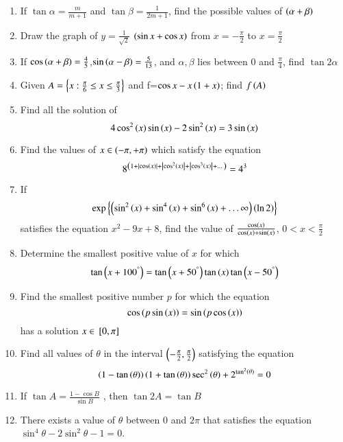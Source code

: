 \begin{enumerate}[label=\thesubsection.\arabic*,ref=\thesubsection.\theenumi]
\begin{enumerate}
\end{enumerate}
\item If $\tan{\alpha}=\frac{m}{m+1}$ and $\tan{\beta}=\frac{1}{2m+1}$, find the possible values of $\left(\alpha+\beta\right)$ \hfill{}
    \item Draw the graph of $y=\frac{1}{\sqrt{2}}$ $\left(\sin {x}+\cos {x}\right)$ from $x=-\frac{\pi}{2}$ to $x=\frac{\pi}{2}$
    \item If $\cos{\ensuremath{\left(\alpha+\beta\right)}}=\frac{4}{5}$,$\sin{\ensuremath{\left(\alpha-\beta\right)}}=\frac{5}{13}$, and $\alpha,\beta$ lies between $0$ and $\frac{\pi}{4}$, find $\tan{2\alpha}$ \hfill{}
\item Given $A=\left\{x:\frac{\pi}{6}\le x\le\frac{\pi}{3}\right\}$ and f=$\cos{x-x\ensuremath{\left(1+x\right)}}$; find $f\left(A\right)$ \hfill{}


\item Find all the solution of 
$$
4\cos^2\left(x\right) \sin \left(x\right) -2\sin^2\left(x\right) = 3\sin \left(x\right)
$$
\hfill{}
\item Find the values of $x \in \left(-\pi, +\pi\right)$ which satisfy the equation
$$
8^{\left(1+\left\vert\cos \left(x\right)\right\vert+\left\vert\cos^2\left(x\right)\right\vert+\left\vert\cos^3\left(x\right)\right\vert+\dots\right)}= 4^3
$$
\hfill{}
\item If 
$$
	\exp \left\{\left(\sin^2\left(x\right)+\sin^4\left(x\right)+\sin^6\left(x\right)+\dots\infty\right)\left(\ln 2\right)\right\}
$$
satisfies the equation $x^2-9x+8$, find the value of $\frac{\cos \left(x\right)}{\cos \left(x\right) + \sin \left(x\right)}$, $0<x<\frac{\pi}{2}$
\hfill{}
\item Determine the smallest positive value of $x$  for which 
$$
\tan {\ensuremath{\left(x+100^{\degree}\right)}}=\tan {\ensuremath{\left(x+50^{\degree}\right)}}\tan \left(x\right)\tan {\ensuremath{\left(x-50^{\degree}\right)}}
$$
\hfill{}
\item Find the smallest positive number $p$ for which the equation 
$$
\cos {\ensuremath{\left(p\sin \left(x\right)\right)}}=\sin {\ensuremath{\left(p\cos \left(x\right)\right)}}
$$
has a solution $ x \in {}\left[0, \pi\right]$
\hfill{}
\item Find all values of $\theta$ in the interval $\left(-\frac{\pi}{2},\frac{\pi}{2}\right)$ satisfying the equation 
$$
\left(1-\tan \left(\theta\right)\right)\left(1+\tan \left(\theta\right)\right)\sec^2\left(\theta\right)+ 2^{\tan^2\left(\theta\right)}=0
$$
\hfill{}
\item If $\tan A = \frac{1-\cos B}{\sin B}$ , then $\tan 2A = \tan B$ 
\hfill{}
\item There exists a value of $\theta$ between $0$ and $2\pi$ that satisfies the equation $\sin^{4}\theta -2\sin^{2}\theta-1=0$. 
\hfill{}

\end{enumerate}
